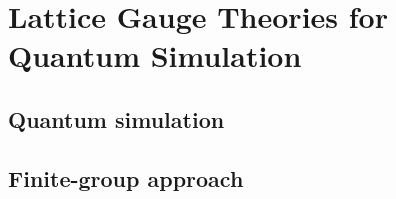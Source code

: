 \chapter{Lattice Gauge Theories for Quantum Simulation}
\label{chap:lattice_gauge_theories_for_quantum_simulation}


\section{Quantum simulation}
\label{sec:quantum_simulation}

\section{Finite-group approach}
\label{sec:finite_group_approach}

